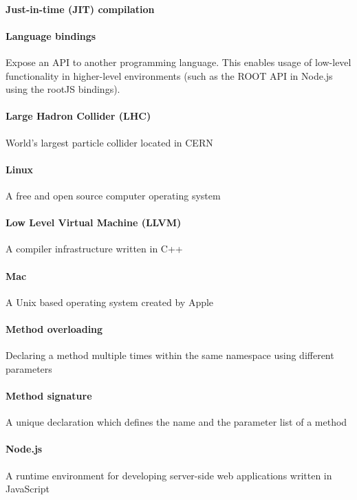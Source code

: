 \paragraph{Just-in-time (JIT) compilation}

\paragraph{Language bindings}
Expose an API to another programming language. This enables usage of low-level functionality in higher-level environments (such as the ROOT API in Node.js using the rootJS bindings).

\paragraph{Large Hadron Collider (LHC)}
World's largest particle collider located in CERN

\paragraph{Linux}
A free and open source computer operating system

\paragraph{Low Level Virtual Machine (LLVM)}
A compiler infrastructure written in C++

\paragraph{Mac}
A Unix based operating system created by Apple

\paragraph{Method overloading}
Declaring a method multiple times within the same namespace using different parameters

\paragraph{Method signature}
A unique declaration which defines the name and the parameter list of a method

\paragraph{Node.js}
A runtime environment for developing server-side web applications written in JavaScript

